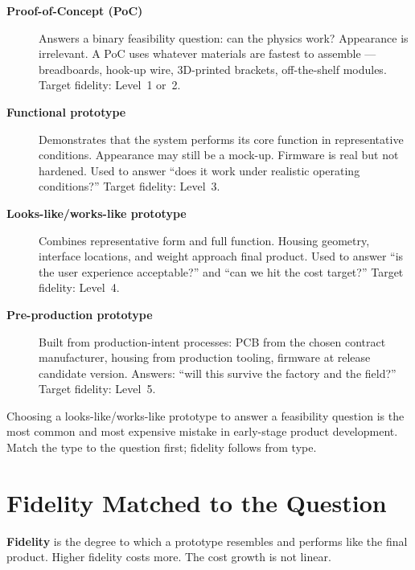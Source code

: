 \begin{description}
  \item[\textbf{Proof-of-Concept (PoC)}]
    Answers a binary feasibility question: can the physics work?
    Appearance is irrelevant.
    A PoC uses whatever materials are fastest to assemble --- breadboards,
    hook-up wire, 3D-printed brackets, off-the-shelf modules.
    Target fidelity: Level~1 or~2.

  \item[\textbf{Functional prototype}]
    Demonstrates that the system performs its core function in representative
    conditions.
    Appearance may still be a mock-up.
    Firmware is real but not hardened.
    Used to answer ``does it work under realistic operating conditions?''
    Target fidelity: Level~3.

  \item[\textbf{Looks-like/works-like prototype}]
    Combines representative form and full function.
    Housing geometry, interface locations, and weight approach final product.
    Used to answer ``is the user experience acceptable?'' and ``can we hit the
    cost target?''
    Target fidelity: Level~4.

  \item[\textbf{Pre-production prototype}]
    Built from production-intent processes: PCB from the chosen contract
    manufacturer, housing from production tooling, firmware at release
    candidate version.
    Answers: ``will this survive the factory and the field?''
    Target fidelity: Level~5.
\end{description}

Choosing a looks-like/works-like prototype to answer a feasibility question
is the most common and most expensive mistake in early-stage product
development.
Match the type to the question first; fidelity follows from type.

\section{Fidelity Matched to the Question}
\label{sec:ch3-fidelity}

\textbf{Fidelity} is the degree to which a prototype
resembles and performs like the final product.
Higher fidelity costs more.
The cost growth is not linear.

